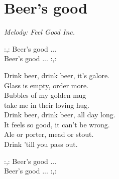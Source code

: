 \section{Beer's good}
\textit{Melody: Feel Good Inc.}

:,: Beer's good ...\\
Beer's good ... :,:

Drink beer, drink beer, it's galore.\\
Glass is empty, order more.\\
Bubbles of my golden mug\\
take me in their loving hug.\\
Drink beer, drink beer, all day long.\\
It feels so good, it can't be wrong.\\
Ale or porter, mead or stout.\\
Drink 'till you pass out.

:,: Beer's good ...\\
Beer's good ... :,: